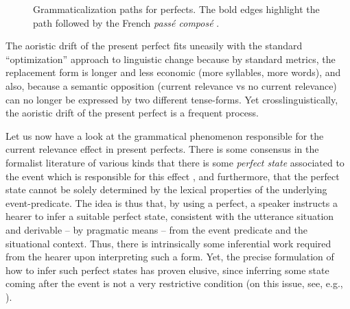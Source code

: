 \documentclass[output=paper,hidelinks]{langscibook}
\begin{document}
\begin{figure}
  \small
 \caption{Grammaticalization paths for perfects. The bold edges highlight the path followed by the French \emph{passé composé} \citep[following][102]{bybee94}.}
 \label{fig:perfects}
\end{figure}

The aoristic drift of the present perfect fits uneasily with the standard ``optimization'' approach to linguistic change because by standard metrics, the replacement form is longer and less economic (more syllables, more words), and also, because a semantic opposition (current relevance vs no current relevance) can no longer be expressed by two different tense-forms. Yet crosslinguistically, the aoristic drift of the present perfect is a frequent process. 

Let us now have a look at the grammatical phenomenon responsible for the current relevance effect in present perfects.
There is some consensus in the formalist literature of various kinds that there is some \emph{perfect state} associated to the event which is responsible for this effect \citep[see, e.g.,][]{rothstein08,nishiyama10,portner03}, and furthermore, that the perfect state cannot be solely determined by the lexical properties of the underlying event-predicate. The idea is thus that, by using a perfect, a speaker instructs a hearer to infer a suitable perfect state, consistent with the utterance situation and derivable -- by pragmatic means -- from the event predicate and the situational context. Thus, there is intrinsically some inferential work required from the hearer upon interpreting such a form. Yet, the precise formulation of how to infer such perfect states has proven elusive, since inferring some state coming after the event is not a very restrictive condition (on this issue, see, e.g., \citealt{schaden09,nishiyama10}).
\end{document}
